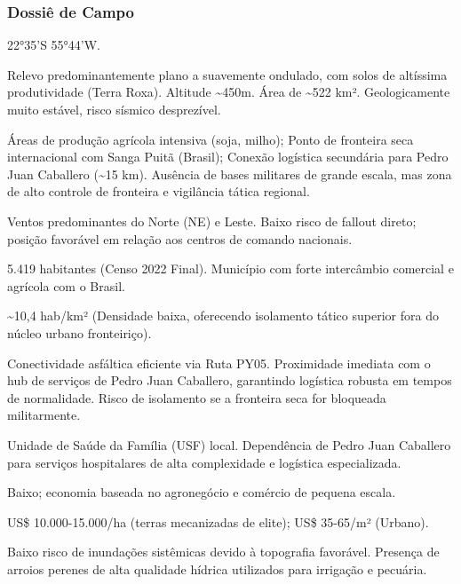 \subsubsection{Dossiê de Campo}
\begin{description}[style=nextline,leftmargin=0.5cm,font=\bfseries]
\item[Coordenadas]  22°35'S 55°44'W.
\item[Topografia]  Relevo predominantemente plano a suavemente ondulado, com solos de altíssima produtividade (Terra Roxa). Altitude \textasciitilde 450m. Área de \textasciitilde 522 km². Geologicamente muito estável, risco sísmico desprezível.
\item[Alvos Estratégicos]  Áreas de produção agrícola intensiva (soja, milho); Ponto de fronteira seca internacional com Sanga Puitã (Brasil); Conexão logística secundária para Pedro Juan Caballero (\textasciitilde 15 km). Ausência de bases militares de grande escala, mas zona de alto controle de fronteira e vigilância tática regional.
\item[Fallout]  Ventos predominantes do Norte (NE) e Leste. Baixo risco de fallout direto; posição favorável em relação aos centros de comando nacionais.
\item[População]  5.419 habitantes (Censo 2022 Final). Município com forte intercâmbio comercial e agrícola com o Brasil.
\item[Densidade]  \textasciitilde 10,4 hab/\allowbreak km² (Densidade baixa, oferecendo isolamento tático superior fora do núcleo urbano fronteiriço).
\item[Vias de Acesso]  Conectividade asfáltica eficiente via Ruta PY05. Proximidade imediata com o hub de serviços de Pedro Juan Caballero, garantindo logística robusta em tempos de normalidade. Risco de isolamento se a fronteira seca for bloqueada militarmente.
\item[Serviços]  Unidade de Saúde da Família (USF) local. Dependência de Pedro Juan Caballero para serviços hospitalares de alta complexidade e logística especializada.
\item[Custo de Vida]  Baixo; economia baseada no agronegócio e comércio de pequena escala.
\item[Preço da Terra]  US\$ 10.000-15.000/\allowbreak ha (terras mecanizadas de elite); US\$ 35-65/\allowbreak m² (Urbano).
\item[Hidrologia]  Baixo risco de inundações sistêmicas devido à topografia favorável. Presença de arroios perenes de alta qualidade hídrica utilizados para irrigação e pecuária.

\end{description}
